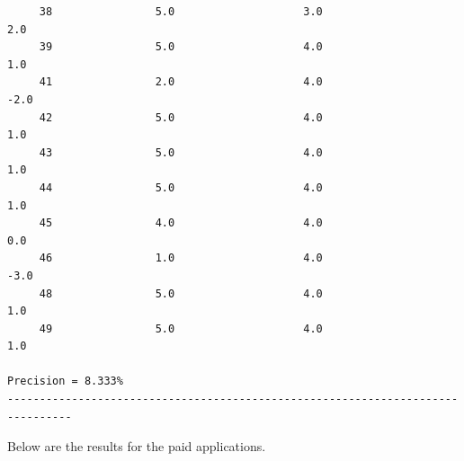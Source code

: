 \documentclass[11pt]{report} %
\begin{document}
\begin{verbatim}
     38                5.0                    3.0                    2.0
     39                5.0                    4.0                    1.0
     41                2.0                    4.0                   -2.0
     42                5.0                    4.0                    1.0
     43                5.0                    4.0                    1.0
     44                5.0                    4.0                    1.0
     45                4.0                    4.0                    0.0
     46                1.0                    4.0                   -3.0
     48                5.0                    4.0                    1.0
     49                5.0                    4.0                    1.0

Precision = 8.333%
--------------------------------------------------------------------------------

\end{verbatim}

Below are the results for the paid applications.
\end{document}

